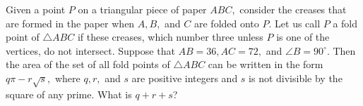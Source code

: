 Given a point $P$ on a triangular piece of paper $ABC,$ consider the creases that are formed in the paper when $A, B,$ and $C$ are folded onto $P.$  Let us call $P$ a fold point of $\triangle ABC$ if these creases, which number three unless $P$ is one of the vertices, do not intersect.  Suppose that $AB=36, AC=72,$ and $\angle B=90^\circ.$  Then the area of the set of all fold points of $\triangle ABC$ can be written in the form $q\pi-r\sqrt{s},$ where $q, r,$ and $s$ are positive integers and $s$ is not divisible by the square of any prime.  What is $q+r+s$?
